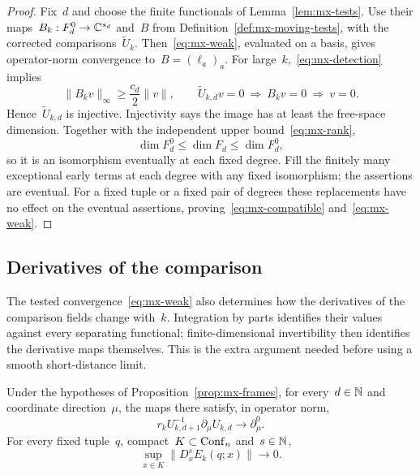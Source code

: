 \begin{proof}
Fix~$d$ and choose the finite functionals of Lemma~\ref{lem:mx-tests}.
Use their maps~$B_k:F_d^0\to\mathbb C^{s_d}$ and~$B$ from Definition~\ref{def:mx-moving-tests}, with the corrected comparisons~$\widetilde U_k$.
Then~\eqref{eq:mx-weak}, evaluated on a basis, gives operator-norm convergence to~$B=(\ell_a)_a$.
For large~$k$,~\eqref{eq:mx-detection} implies
\begin{equation*}
 \|B_kv\|_\infty\ge\frac{c_d}{2}\|v\|,
 \qquad
 \widetilde U_{k,d}v=0\ \Longrightarrow\ B_kv=0\ \Longrightarrow\ v=0.
\end{equation*}
Hence~$\widetilde U_{k,d}$ is injective.
Injectivity says the image has at least the free-space dimension. Together with the independent upper bound~\eqref{eq:mx-rank},
\begin{equation*}
 \dim F_d^0\le\dim F_d\le\dim F_d^0,
\end{equation*}
so it is an isomorphism eventually at each fixed degree.
Fill the finitely many exceptional early terms at each degree with any fixed isomorphism; the assertions are eventual.
For a fixed tuple or a fixed pair of degrees these replacements have no effect on the eventual assertions, proving~\eqref{eq:mx-compatible} and~\eqref{eq:mx-weak}.
\end{proof}

\subsection{Derivatives of the comparison}\label{subsec:mx-smooth}

The tested convergence~\eqref{eq:mx-weak} also determines how the derivatives of the comparison fields change with~$k$.
Integration by parts identifies their values against every separating functional; finite-dimensional invertibility then identifies the derivative maps themselves.
This is the extra argument needed before using a smooth short-distance limit.

\begin{proposition}\label{prop:mx-smooth}
Under the hypotheses of Proposition~\ref{prop:mx-frames}, for every~$d\in\mathbb N$ and coordinate direction~$\mu$, the maps there satisfy, in operator norm,
\begin{equation}\label{eq:mx-transported-derivative}
 r_kU_{k,d+1}^{-1}\partial_\mu U_{k,d}\longrightarrow\partial_\mu^0.
\end{equation}
For every fixed tuple~$q$, compact~$K\subset\operatorname{Conf}_{n}$ and~$s\in\mathbb N$,
\begin{equation}\label{eq:mx-smooth-limit}
 \sup_{x\in K}\|D_x^s E_k(q;x)\|\longrightarrow0.
\end{equation}
\end{proposition}

